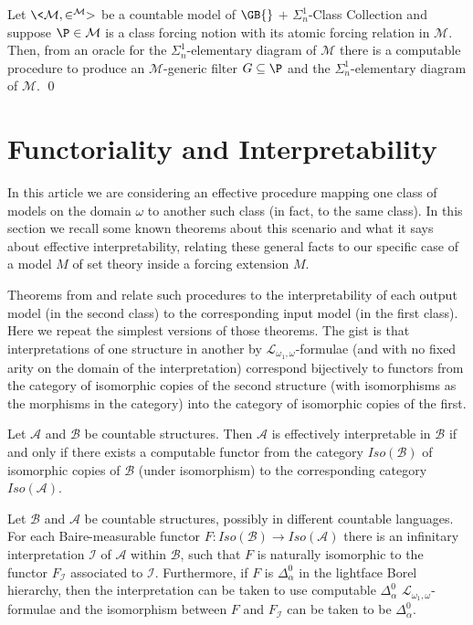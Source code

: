 \documentclass{amsart}
\begin{document}
 \begin{corollary}
 Let $\<\mathcal{M},\in^{\mathcal{M}}>$ be a countable model of $\GB{}$ $+$ $\Sigma^1_n$-Class Collection and suppose $\P \in \mathcal M$ is a class forcing notion with its atomic forcing relation in $\mathcal M$. Then, from an oracle for the $\Sigma^1_n$-elementary diagram of $\mathcal M$ there is a computable procedure to produce an $\mathcal M$-generic filter $G \subseteq \P$ and the  $\Sigma^1_n$-elementary diagram of $\mathcal{M}$. \qed
 \end{corollary}
 
 
 \section{Functoriality and Interpretability}
 \label{sec:functoriality}
 
 In this article we are considering an effective procedure mapping one class of models
 on the domain $\omega$ to another such class (in fact, to the same class). In this section we recall some known theorems about this scenario and what it says about effective interpretability, relating these general facts to our specific case of a model $M$ of set theory inside a forcing extension $M$.
 
 Theorems from \cite{HTM3} and \cite{HTM2} relate such procedures
 to the interpretability of each output model (in the second class) to the
 corresponding input model (in the first class).  Here we repeat
 the simplest versions of those theorems.  The gist is that interpretations
 of one structure in another by $\mathcal{L}_{\omega_1,\omega}$-formulae
 (and with no fixed arity on the domain of the interpretation) correspond bijectively
 to functors from the category of isomorphic copies of the second structure
 (with isomorphisms as the morphisms in the category)
 into the category of isomorphic copies of the first.
 
 \begin{theorem}
 \label{thm:HTM3}
 Let $\mathcal A$ and $\mathcal B$ be countable structures. Then
 $\mathcal A$ is effectively interpretable in $\mathcal B$ if and only if
 there exists a computable functor from the category $Iso(\mathcal B)$
 of isomorphic copies of $\mathcal B$ (under isomorphism) to the
 corresponding category $Iso(\mathcal A)$.
 \end{theorem}
 \begin{theorem}
 \label{thm:HTM2}
 Let $\mathcal B$ and $\mathcal A$ be countable structures, possibly in different countable languages.
 For each Baire-measurable functor $F:Iso(\mathcal B)\to Iso(\mathcal A)$ there is an
 infinitary interpretation $\mathcal I$ of $\mathcal A$ within $\mathcal B$, such that $F$ is naturally isomorphic
 to the functor $F_{\mathcal I}$ associated to $\mathcal I$.  Furthermore, if $F$ is $\Delta^0_{\alpha}$
 in the lightface Borel hierarchy, then the interpretation can be taken to use
 computable $\Delta^0_\alpha$ $\mathcal{L}_{\omega_1,\omega}$-formulae and the isomorphism
 between $F$ and $F_{\mathcal I}$ can be taken to be $\Delta^0_\alpha$.
 \end{theorem}
 
\end{document}
